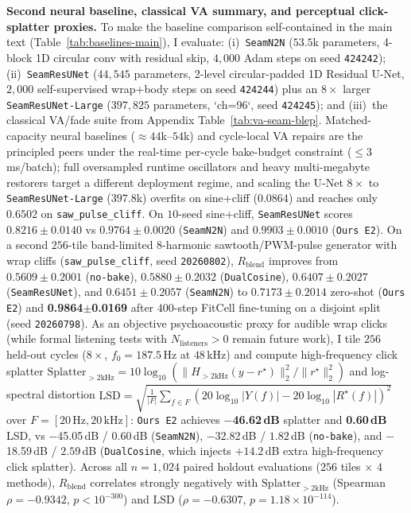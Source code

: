 \textbf{Second neural baseline, classical VA summary, and perceptual click-splatter proxies.}
To make the baseline comparison self-contained in the main text (Table~\ref{tab:baselines-main}), I evaluate: (i)~\texttt{SeamN2N} ($53.5$k parameters, 4-block 1D circular conv with residual skip, $4{,}000$ Adam steps on seed \texttt{424242}); (ii)~\texttt{SeamResUNet} ($44{,}545$ parameters, 2-level circular-padded 1D Residual U-Net, $2{,}000$ self-supervised wrap+body steps on seed \texttt{424244}) plus an $8{\times}$ larger \texttt{SeamResUNet-Large} ($397{,}825$ parameters, `ch=96`, seed \texttt{424245}); and (iii)~the classical VA/fade suite from Appendix Table~\ref{tab:va-seam-blep}.
Matched-capacity neural baselines ($\approx 44$k--$54$k) and cycle-local VA repairs are the principled peers under the real-time per-cycle bake-budget constraint (${\le}3$\,ms/batch); full oversampled runtime oscillators and heavy multi-megabyte restorers target a different deployment regime, and scaling the U-Net $8{\times}$ to \texttt{SeamResUNet-Large} ($397.8$k) overfits on sine+cliff ($0.0864$) and reaches only $0.6502$ on \texttt{saw\_pulse\_cliff}.
On $10$-seed sine+cliff, \texttt{SeamResUNet} scores $0.8216{\pm}0.0140$ vs $0.9764{\pm}0.0020$ (\texttt{SeamN2N}) and $0.9903{\pm}0.0010$ (\texttt{Ours E2}).
On a second $256$-tile band-limited $8$-harmonic sawtooth/PWM-pulse generator with wrap cliffs (\texttt{saw\_pulse\_cliff}, seed \texttt{20260802}), $R_{\mathrm{blend}}$ improves from $0.5609{\pm}0.2001$ (\texttt{no-bake}), $0.5880{\pm}0.2032$ (\texttt{DualCosine}), $0.6407{\pm}0.2027$ (\texttt{SeamResUNet}), and $0.6451{\pm}0.2057$ (\texttt{SeamN2N}) to $0.7173{\pm}0.2014$ zero-shot (\texttt{Ours E2}) and \textbf{0.9864$\pm$0.0169} after $400$-step FitCell fine-tuning on a disjoint split (seed \texttt{20260798}).
As an objective psychoacoustic proxy for audible wrap clicks (while formal listening tests with $N_{\mathrm{listeners}}{>}0$ remain future work), I tile $256$ held-out cycles ($8\times$, $f_0{=}187.5$\,Hz at $48$\,kHz) and compute high-frequency click splatter $\mathrm{Splatter}_{>2\mathrm{kHz}} = 10\log_{10}(\|H_{>2\mathrm{kHz}}(y-r^{\star})\|_2^2 / \|r^{\star}\|_2^2)$ and log-spectral distortion $\mathrm{LSD} = \sqrt{\frac{1}{|F|}\sum_{f\in F}(20\log_{10}|Y(f)| - 20\log_{10}|R^{\star}(f)|)^2}$ over $F{=}[20\,\mathrm{Hz}, 20\,\mathrm{kHz}]$: \texttt{Ours E2} achieves \textbf{$-$46.62\,dB} splatter and \textbf{0.60\,dB} LSD, vs $-$45.05\,dB / $0.60$\,dB (\texttt{SeamN2N}), $-$32.82\,dB / $1.82$\,dB (\texttt{no-bake}), and $-$18.59\,dB / $2.59$\,dB (\texttt{DualCosine}, which injects $+14.2$\,dB extra high-frequency click splatter). Across all $n{=}1{,}024$ paired holdout evaluations ($256$ tiles $\times$ $4$ methods), $R_{\mathrm{blend}}$ correlates strongly negatively with $\mathrm{Splatter}_{>2\mathrm{kHz}}$ (Spearman $\rho{=}{-}0.9342$, $p{<}10^{-300}$) and $\mathrm{LSD}$ ($\rho{=}{-}0.6307$, $p{=}1.18{\times}10^{-114}$).

